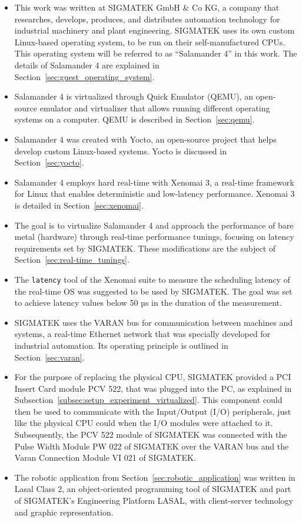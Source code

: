 \documentclass[MMR,Master,english]{style/twbook}
\begin{document}
\begin{itemize}
	\item This work was written at SIGMATEK GmbH \& Co KG, a company that researches, develops, produces, and distributes automation technology for industrial machinery and plant engineering. SIGMATEK uses its own custom Linux-based operating system, to be run on their self-manufactured CPUs. This operating system will be referred to as ``Salamander 4'' in this work. The details of Salamander 4 are explained in Section~\ref{sec:guest_operating_system}.
	\item Salamander 4 is virtualized through Quick Emulator (QEMU), an open-source emulator and virtualizer that allows running different operating systems on a computer. QEMU is described in Section~\ref{sec:qemu}.
	\item Salamander 4 was created with Yocto, an open-source project that helps develop custom Linux-based systems. Yocto is discussed in Section~\ref{sec:yocto}.
	\item Salamander 4 employs hard real-time with Xenomai 3, a real-time framework for Linux that enables deterministic and low-latency performance. Xenomai 3 is detailed in Section~\ref{sec:xenomai}.
	\item The goal is to virtualize Salamander 4 and approach the performance of bare metal (hardware) through real-time performance tunings, focusing on latency requirements set by SIGMATEK. These modifications are the subject of Section~\ref{sec:real-time_tunings}.
	\item The \texttt{latency} tool of the Xenomai suite to measure the scheduling latency of the real-time OS was suggested to be used by SIGMATEK. The goal was set to achieve latency values below 50 µs in the duration of the measurement.
	\item SIGMATEK uses the VARAN bus for communication between machines and systems, a real-time Ethernet network that was specially developed for industrial automation. Its operating principle is outlined in Section~\ref{sec:varan}.
	\item For the purpose of replacing the physical CPU, SIGMATEK provided a PCI Insert Card module PCV 522, that was plugged into the PC, as explained in Subsection~\ref{subsec:setup_experiment_virtualized}. This component could then be used to communicate with the Input/Output (I/O) peripherals, just like the physical CPU could when the I/O modules were attached to it. Subsequently, the PCV 522 module of SIGMATEK was connected with the Pulse Width Module PW 022 of SIGMATEK over the VARAN bus and the Varan Connection Module VI 021 of SIGMATEK.
	\item The robotic application from Section~\ref{sec:robotic_application} was written in Lasal Class 2, an object-oriented programming tool of SIGMATEK and part of SIGMATEK's Engineering Platform LASAL, with client-server technology and graphic representation.
\end{itemize}
\end{document}
